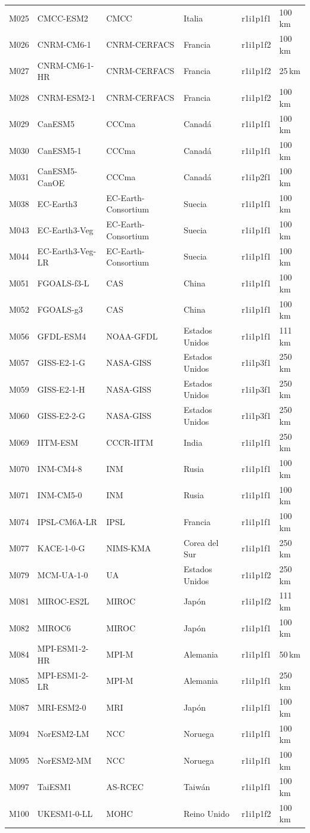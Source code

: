 \documentclass[11pt,a4paper]{article}
\begin{document}
\begin{longtable}{@{}L{1.1cm}L{3.2cm}L{3.2cm}L{2.8cm}L{1.9cm}L{1.9cm}@{}}
M025 & CMCC-ESM2 & CMCC & Italia & r1i1p1f1 & 100\,km \\
M026 & CNRM-CM6-1 & CNRM-CERFACS & Francia & r1i1p1f2 & 100\,km \\
M027 & CNRM-CM6-1-HR & CNRM-CERFACS & Francia & r1i1p1f2 & 25\,km \\
M028 & CNRM-ESM2-1 & CNRM-CERFACS & Francia & r1i1p1f2 & 100\,km \\
M029 & CanESM5 & CCCma & Canad\'a & r1i1p1f1 & 100\,km \\
M030 & CanESM5-1 & CCCma & Canad\'a & r1i1p1f1 & 100\,km \\
M031 & CanESM5-CanOE & CCCma & Canad\'a & r1i1p2f1 & 100\,km \\
M038 & EC-Earth3 & EC-Earth-Consortium & Suecia & r1i1p1f1 & 100\,km \\
M043 & EC-Earth3-Veg & EC-Earth-Consortium & Suecia & r1i1p1f1 & 100\,km \\
M044 & EC-Earth3-Veg-LR & EC-Earth-Consortium & Suecia & r1i1p1f1 & 100\,km \\
M051 & FGOALS-f3-L & CAS & China & r1i1p1f1 & 100\,km \\
M052 & FGOALS-g3 & CAS & China & r1i1p1f1 & 100\,km \\
M056 & GFDL-ESM4 & NOAA-GFDL & Estados Unidos & r1i1p1f1 & 111\,km \\
M057 & GISS-E2-1-G & NASA-GISS & Estados Unidos & r1i1p3f1 & 250\,km \\
M059 & GISS-E2-1-H & NASA-GISS & Estados Unidos & r1i1p3f1 & 250\,km \\
M060 & GISS-E2-2-G & NASA-GISS & Estados Unidos & r1i1p3f1 & 250\,km \\
M069 & IITM-ESM & CCCR-IITM & India & r1i1p1f1 & 250\,km \\
M070 & INM-CM4-8 & INM & Rusia & r1i1p1f1 & 100\,km \\
M071 & INM-CM5-0 & INM & Rusia & r1i1p1f1 & 100\,km \\
M074 & IPSL-CM6A-LR & IPSL & Francia & r1i1p1f1 & 100\,km \\
M077 & KACE-1-0-G & NIMS-KMA & Corea del Sur & r1i1p1f1 & 250\,km \\
M079 & MCM-UA-1-0 & UA & Estados Unidos & r1i1p1f2 & 250\,km \\
M081 & MIROC-ES2L & MIROC & Jap\'on & r1i1p1f2 & 111\,km \\
M082 & MIROC6 & MIROC & Jap\'on & r1i1p1f1 & 100\,km \\
M084 & MPI-ESM1-2-HR & MPI-M & Alemania & r1i1p1f1 & 50\,km \\
M085 & MPI-ESM1-2-LR & MPI-M & Alemania & r1i1p1f1 & 250\,km \\
M087 & MRI-ESM2-0 & MRI & Jap\'on & r1i1p1f1 & 100\,km \\
M094 & NorESM2-LM & NCC & Noruega & r1i1p1f1 & 100\,km \\
M095 & NorESM2-MM & NCC & Noruega & r1i1p1f1 & 100\,km \\
M097 & TaiESM1 & AS-RCEC & Taiw\'an & r1i1p1f1 & 100\,km \\
M100 & UKESM1-0-LL & MOHC & Reino Unido & r1i1p1f2 & 100\,km \\
\end{longtable}
\end{document}
